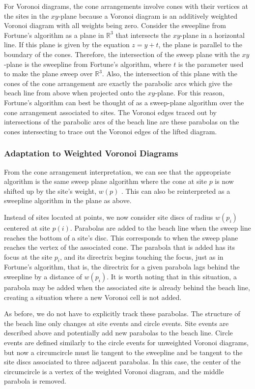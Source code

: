 \documentclass[a4paper, 11pt]{article}
\newcommand{\R}{\mathbb{R}}
\begin{document}
For Voronoi diagrams, the cone arrangements involve cones with their vertices at the sites in the $xy$-plane because a Voronoi diagram is an
additively weighted Voronoi diagram with all weights being zero. Consider the sweepline from Fortune's algorithm as a plane in $\R^3$ that intersects
the $xy$-plane in a horizontal line. If this plane is given by the equation $z = y + t$, the plane is parallel to the boundary of the cones.
Therefore, the intersection of the sweep plane with the $xy$-plane is the sweepline from
Fortune's algorithm, where $t$ is the parameter used to make the plane sweep over $\R^3$. Also, the intersection of this plane with the cones of the
cone arrangement are exactly the parabolic arcs which give the beach line from above when projected onto the $xy$-plane. For this reason, Fortune's algorithm can best be thought of as a sweep-plane
algorithm over the cone arrangement associated to sites. The Voronoi edges traced out by intersections of the parabolic arcs of the beach line are
these parabolas on the cones intersecting to trace out the Voronoi edges of the lifted diagram.

\subsubsection{Adaptation to Weighted Voronoi Diagrams}
From the cone arrangement interpretation, we can see that the appropriate algorithm is the same sweep plane algorithm where the cone at site $p$ is
now shifted up by the site's weight, $w(p)$ \cite{rosenberger_additive}. This can also be reinterpreted as a sweepline algorithm in the plane as
above.

Instead of sites located at points, we now consider site discs of radius $w(p_i)$ centered at site $p(i)$. Parabolas are added to the beach
line when the sweep line reaches the bottom of a site's disc. This corresponds to when the sweep plane reaches the vertex of the associated cone. The
parabola that is added has its focus at the site $p_i$, and its directrix begins touching the focus, just as in Fortune's algorithm, that is, the
directrix for a given parabola lags behind the sweepline by a distance of $w(p_i)$. It is worth noting that in this situation, a parabola may be added
when the associated site is already behind the beach line, creating a situation where a new Voronoi cell is not added.

As before, we do not have to explicitly track these parabolas. The structure of the beach line only changes at site events and circle events. Site
events are described above and potentially add new parabolas to the beach line. Circle events are defined similarly to the circle events for
unweighted Voronoi diagrams, but now a circumcircle must lie tangent to the sweepline and be tangent to the site discs associated to three adjacent
parabolas. In this case, the center of the circumcircle is a vertex of the weighted Voronoi diagram, and the middle parabola is removed.
\end{document}
